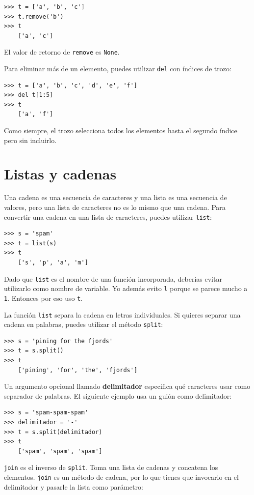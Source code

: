 \documentclass[10pt]{book}
\begin{document}
\begin{verbatim}
>>> t = ['a', 'b', 'c']
>>> t.remove('b')
>>> t
    ['a', 'c']
\end{verbatim}
%
El valor de retorno de {\tt remove} es {\tt None}.

Para eliminar más de un elemento, puedes utilizar {\tt del} con
índices de trozo:

\begin{verbatim}
>>> t = ['a', 'b', 'c', 'd', 'e', 'f']
>>> del t[1:5]
>>> t
    ['a', 'f']
\end{verbatim}
%
Como siempre, el trozo selecciona todos los elementos hasta el segundo índice
pero sin incluirlo.



\section{Listas y cadenas}

Una cadena es una secuencia de caracteres y una lista es una secuencia
de valores, pero una lista de caracteres no es lo mismo que una
cadena.  Para convertir una cadena en una lista de caracteres,
puedes utilizar {\tt list}:

\begin{verbatim}
>>> s = 'spam'
>>> t = list(s)
>>> t
    ['s', 'p', 'a', 'm']
\end{verbatim}
%
Dado que {\tt list} es el nombre de una función incorporada, deberías
evitar utilizarlo como nombre de variable.  Yo además evito {\tt l} porque
se parece mucho a {\tt 1}.  Entonces por eso uso {\tt t}.

La función {\tt list} separa la cadena en letras individuales.  Si
quieres separar una cadena en palabras, puedes utilizar
el método {\tt split}:

\begin{verbatim}
>>> s = 'pining for the fjords'
>>> t = s.split()
>>> t
    ['pining', 'for', 'the', 'fjords']
\end{verbatim}
%
Un argumento opcional llamado {\bf delimitador} especifica qué
caracteres usar como separador de palabras.
El siguiente ejemplo
usa un guión como delimitador:

\begin{verbatim}
>>> s = 'spam-spam-spam'
>>> delimitador = '-'
>>> t = s.split(delimitador)
>>> t
    ['spam', 'spam', 'spam']
\end{verbatim}
%
{\tt join} es el inverso de {\tt split}.
Toma una lista de cadenas y
concatena los elementos.  {\tt join} es un método de cadena,
por lo que tienes que invocarlo en el delimitador y pasarle la
lista como parámetro:
\end{document}
